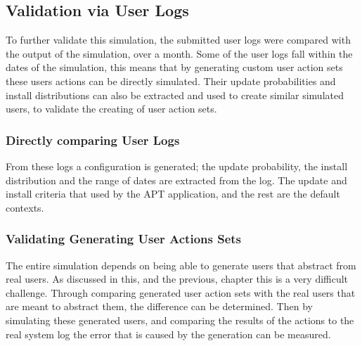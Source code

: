 
\subsection{Validation via User Logs}
To further validate this simulation, the submitted user logs were compared with the output of the simulation, over a month.
Some of the user logs fall within the dates of the simulation, this means that by generating custom user action sets these users actions can be directly simulated.
Their update probabilities and install distributions can also be extracted and used to create similar simulated users, to validate the creating of user action sets.

\subsubsection{Directly comparing User Logs}
From these logs a configuration is generated; the update probability, the install distribution and the range of dates are extracted from the log.
The update and install criteria that used by the APT application, and the rest are the default contexts.  


\subsubsection{Validating Generating User Actions Sets}
The entire simulation depends on being able to generate users that abstract from real users.
As discussed in this, and the previous, chapter this is a very difficult challenge.
Through comparing generated user action sets with the real users that are meant to abstract them, the difference can be determined.
Then by simulating these generated users, and comparing the results of the actions to the real system log the error that is caused by the generation can be measured.  






